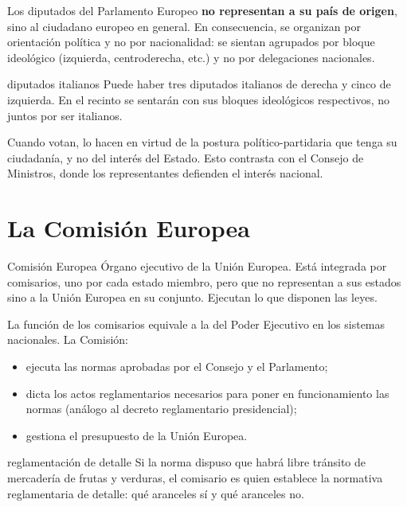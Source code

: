 \documentclass[12pt,oneside]{book}
\begin{document}
Los diputados del Parlamento Europeo \textbf{no representan a su país de origen}, sino al ciudadano europeo en general. En consecuencia, se organizan por orientación política y no por nacionalidad: se sientan agrupados por bloque ideológico (izquierda, centroderecha, etc.) y no por delegaciones nacionales.

\begin{example}{diputados italianos}
Puede haber tres diputados italianos de derecha y cinco de izquierda. En el recinto se sentarán con sus bloques ideológicos respectivos, no juntos por ser italianos.
\end{example}

Cuando votan, lo hacen en virtud de la postura político-partidaria que tenga su ciudadanía, y no del interés del Estado. Esto contrasta con el Consejo de Ministros, donde los representantes defienden el interés nacional.

\section{La Comisión Europea}

\begin{definition}{Comisión Europea}
Órgano ejecutivo de la Unión Europea. Está integrada por comisarios, uno por cada estado miembro, pero que no representan a sus estados sino a la Unión Europea en su conjunto. Ejecutan lo que disponen las leyes.
\end{definition}

La función de los comisarios equivale a la del Poder Ejecutivo en los sistemas nacionales. La Comisión:

\begin{itemize}
    \item ejecuta las normas aprobadas por el Consejo y el Parlamento;
    \item dicta los actos reglamentarios necesarios para poner en funcionamiento las normas (análogo al decreto reglamentario presidencial);
    \item gestiona el presupuesto de la Unión Europea.
\end{itemize}

\begin{example}{reglamentación de detalle}
Si la norma dispuso que habrá libre tránsito de mercadería de frutas y verduras, el comisario es quien establece la normativa reglamentaria de detalle: qué aranceles sí y qué aranceles no.
\end{example}
\end{document}
